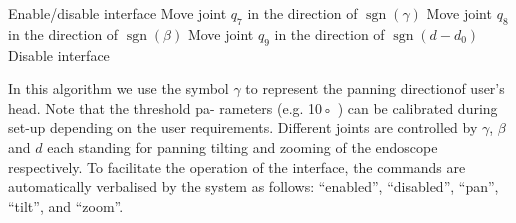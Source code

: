 \documentclass[journal,twoside]{IEEEtran}
\theoremstyle{definition}
\DeclareMathOperator{\sgn}{sgn}
\begin{document}
\begin{algorithmic}[1]
				\Loop {}
						\State Enable/disable interface 
					\EndIf
							\State Move joint $q_7$ in the direction of $\sgn(\gamma)$
							\State Move joint $q_8$ in the direction of $\sgn(\beta)$
							\State Move joint $q_9$ in the direction of $\sgn(d - d_0)$
							\State Disable interface
						\EndIf
					\EndIf 
				\EndLoop
\end{algorithmic}
In this algorithm we use the symbol $\gamma$ to represent the
panning directionof user's head. Note that the threshold pa-
rameters (e.g. 10◦ ) can be calibrated during set-up depending
on the user requirements. Different joints are controlled by $\gamma$, $\beta$ and $d$ each standing for panning tilting and zooming of the endoscope respectively. To facilitate the
operation of the interface, the commands are automatically
verbalised by the system as follows: “enabled”, “disabled”,
“pan”, “tilt”, and “zoom”.
\end{document}
